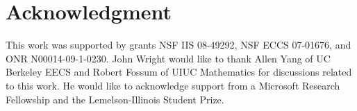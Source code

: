 \documentclass[12pt,journal,draftcls,letterpaper,onecolumn]{IEEEtran}
\begin{document}
%
%


\section*{Acknowledgment}
This work was supported by grants NSF IIS 08-49292, NSF ECCS
07-01676, and ONR N00014-09-1-0230. John Wright would like to
thank Allen Yang of UC Berkeley EECS and Robert Fossum of UIUC
Mathematics for discussions related to this work. He would like
to acknowledge support from a Microsoft Research Fellowship and
the Lemelson-Illinois Student Prize.

\end{document}
